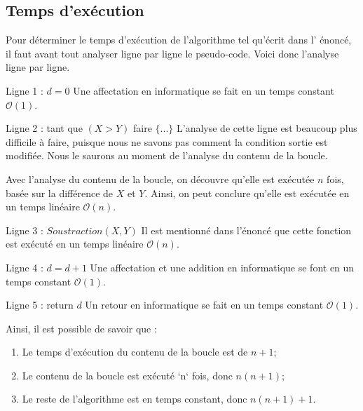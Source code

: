 \documentclass[12pt]{article}
\begin{document}
	\subsection*{Temps d'exécution}
    Pour déterminer le temps d'exécution de l'algorithme tel qu'écrit dans l'
    énoncé, il faut avant tout analyser ligne par ligne le pseudo-code. Voici
    donc l'analyse ligne par ligne. \newline

    Ligne 1 : \( d = 0 \) \newline
    Une affectation en informatique se fait en un temps constant
    \( \mathcal{O}(1) \). \newline

    Ligne 2 : tant que \( (X > Y) \) faire \( \{ ... \} \) \newline
    L'analyse de cette ligne est beaucoup plus difficile à faire, puisque nous
	  ne savons pas comment la condition sortie est modifiée. Nous le saurons au
    moment de l'analyse du contenu de la boucle. \newline

  	Avec l'analyse du contenu de la boucle, on découvre qu'elle est exécutée
  	\( n \) fois, basée sur la différence de \( X \) et \( Y \). Ainsi, on peut
    conclure qu'elle est exécutée en un temps linéaire \( \mathcal{O}(n) \).
    \newline

    Ligne 3 : \( Soustraction(X, Y) \) \newline
    Il est mentionné dans l'énoncé que cette fonction est exécuté en un temps
	  linéaire \( \mathcal{O}(n) \). \newline

    Ligne 4 : \( d = d + 1 \) \newline
    Une affectation et une addition en informatique se font en un temps constant
    \( \mathcal{O}(1) \). \newline

    Ligne 5 : return \( d \) \newline
  	Un retour en informatique se fait en un temps constant
    \( \mathcal{O}(1) \). \newline

    \noindent Ainsi, il est possible de savoir que :
    \begin{enumerate}
      \item Le temps d'exécution du contenu de la boucle est de \( n + 1 \);
      \item Le contenu de la boucle est exécuté `n` fois, donc \( n(n + 1) \);
      \item Le reste de l'algorithme est en temps constant, donc
       \( n(n + 1) + 1 \).
    \end{enumerate}
\end{document}

